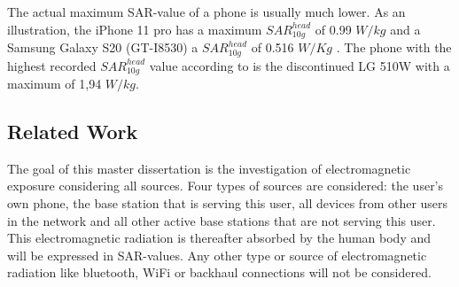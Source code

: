 The actual maximum \gls{SAR}-value of a phone is usually much lower. As an illustration, the 
iPhone 11 pro has a maximum $SAR_{10g}^{head}$ of 0.99 $W/kg$ \cite{S21} and a Samsung Galaxy S20 (GT-I8530) a
 $SAR_{10g}^{head}$ of 0.516 $W/Kg$ \cite{S22,SARDatabase}. The phone with the highest recorded $SAR_{10g}^{head}$ value 
 according to \cite{SARDatabase} is the discontinued LG 510W with a maximum of 1,94 $W/kg$.

\subsection{Related Work} %
\label{sub:general}
The goal of this master dissertation is the investigation of electromagnetic exposure considering all sources. Four types of sources are considered: the user's own phone,
 the base station that is serving this user, 
all devices from other users in the network and all 
other active base stations that are not serving this user. This electromagnetic radiation is thereafter
absorbed by the human body and will be expressed in \gls{SAR}-values. 
Any other type or source of electromagnetic radiation like bluetooth, WiFi or backhaul connections will not be considered.

